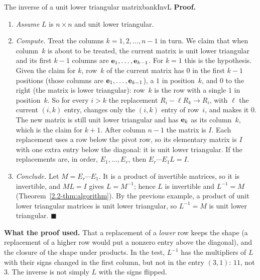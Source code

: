 \documentclass[11pt]{article}
\begin{document}
\begin{exmp}{The inverse of a unit lower triangular matrix}{bankInvL}
\textbf{Proof.}
\begin{enumerate}[itemsep=2pt]
  \item \emph{Assume} $L$ is $n\times n$ and unit lower triangular.
  \item \emph{Compute.} Treat the columns $k=1,2,\dots,n-1$ in turn. We claim that when column~$k$ is about to be treated, the current matrix is unit lower triangular and its first $k-1$ columns are $\mathbf{e}_1,\dots,\mathbf{e}_{k-1}$. For $k=1$ this is the hypothesis. Given the claim for $k$, row~$k$ of the current matrix has $0$ in the first $k-1$ positions (those columns are $\mathbf{e}_1,\dots,\mathbf{e}_{k-1}$), a $1$ in position~$k$, and $0$ to the right (the matrix is lower triangular): row~$k$ is the row with a single $1$ in position~$k$. So for every $i>k$ the replacement $R_i-\ell R_k\to R_i$, with $\ell$ the current $(i,k)$ entry, changes only the $(i,k)$ entry of row~$i$, and makes it $0$. The new matrix is still unit lower triangular and has $\mathbf{e}_k$ as its column~$k$, which is the claim for $k+1$. After column $n-1$ the matrix is $I$. Each replacement uses a row below the pivot row, so its elementary matrix is $I$ with one extra entry below the diagonal: it is unit lower triangular. If the replacements are, in order, $E_1,\dots,E_r$, then $E_r\cdots E_1L=I$.
  \item \emph{Conclude.} Let $M=E_r\cdots E_1$. It is a product of invertible matrices, so it is invertible, and $ML=I$ gives $L=M^{-1}$; hence $L$ is invertible and $L^{-1}=M$ (Theorem~\ref{2.2-thm:algorithm}). By the previous example, a product of unit lower triangular matrices is unit lower triangular, so $L^{-1}=M$ is unit lower triangular. \qquad$\blacksquare$
\end{enumerate}

\textbf{What the proof used.} That a replacement of a \emph{lower} row keeps the shape (a replacement of a higher row would put a nonzero entry above the diagonal), and the closure of the shape under products. In the test, $L^{-1}$ has the multipliers of $L$ with their signs changed in the first column, but not in the entry $(3,1)$: $11$, not $3$. The inverse is not simply $L$ with the signs flipped.
\end{exmp}
\end{document}
